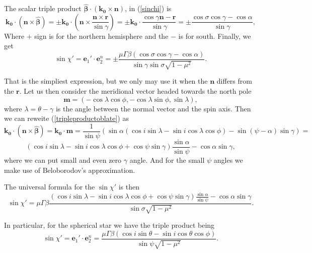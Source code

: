 \documentclass[14pt]{article}
\newcommand{\be}{\begin{equation}}
\newcommand{\ee}{\end{equation}}
\begin{document}
			The scalar triple product $\bm{\hat\beta} \cdot(\bm{k_0} \times \bm{n}) $, in (\ref{sinchi}) is
			\be\label{tripleproductoblate}
			 \bm{k_0} \cdot (\bm{n}\times\bm{\hat\beta} )=\pm
			 \bm{k_0} \cdot \left(\bm{n} \times \frac{\bm{n} \times \bm{r}}{\sin{\gamma}}\right)=\pm
			 \bm{k_0} \cdot \frac{\cos{\gamma}\bm{n} - \bm{r}}{\sin{\gamma}} =\pm
			 \frac{\cos{\sigma}\cos{\gamma}-\cos{\alpha}}{\sin{\gamma}},
			\ee
			Where $+$ sign is for the northern hemisphere and the $-$ is for south.
			Finally, we get
			\be\label{chiprime}
			\sin{\chi'}=\bm{e}_1'\cdot \bm{e}_2^n =\pm
			 \frac{\mu\Gamma\beta (\cos{\sigma}\cos{\gamma}-\cos{\alpha})}{\sin{\gamma}\sin{\sigma}\sqrt{1-\mu^2} }.
			\ee

			That is the simpliest expression, but we only may use it when the $\bm n$ differs from the $\bm r$. 
			Let us then  consider the meridional vector headed towards the north pole
			\be
				\bm m = (- \cos \lambda \cos \phi, -\cos \lambda \sin \phi, \sin \lambda ),
			\ee
			where $\lambda=\theta-\gamma$ is the angle between the normal vector and the spin axis.
			Then we can reweite (\ref{tripleproductoblate}) as
			$$
			 \bm{k_0} \cdot (\bm{n}\times\bm{\hat\beta} )=
			 \bm{k_0} \cdot \bm{m}=\frac1{\sin\psi}(\sin \alpha(\cos i \sin \lambda - \sin i \cos \lambda \cos \phi ) - \sin(\psi-\alpha)\sin\gamma )=	
			$$\be\label{tripleproductpherical}
				(\cos i \sin \lambda - \sin i \cos \lambda \cos \phi+\cos\psi \sin\gamma)\frac{\sin\alpha}{\sin\psi} - \cos \alpha\sin\gamma, 
			\ee
			where we can put small and even zero $\gamma$ angle. And for the small 
			$\psi$
			angles we make use of Beloborodov's approximation.

			The universal formula for the $\sin\chi'$ is then 
			\be
				\sin\chi'={\mu\Gamma\beta }\frac{(\cos i \sin \lambda - \sin i \cos \lambda \cos \phi+\cos\psi \sin\gamma)\frac{\sin\alpha}{\sin\psi} - \cos \alpha\sin\gamma}{\sin{\sigma}\sqrt{1-\mu^2} }.
			\ee
      
			In particular, for the spherical star we have the triple product being 
			\be\label{chiprimespherical}
			\sin{\chi'}=\bm{e}_1'\cdot \bm{e}_2^n =
			 \frac{\mu\Gamma\beta (\cos i \sin \theta - \sin i \cos \theta \cos \phi)}{\sin{\psi}\sqrt{1-\mu^2} }.
			\ee
\end{document}
